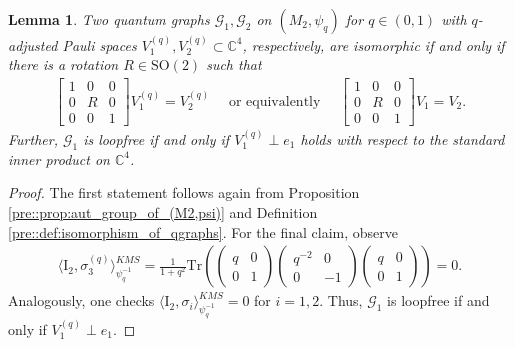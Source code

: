\documentclass{amsart}
\newtheorem{lemma}[thm]{Lemma}
\newcommand{\C}{\mathbb{C}}
\begin{document}
\begin{lemma}
    \label{pau::lemma:q_adjusted_Pauli_spaces_of_isomorphic_nontracial_qgraphs}
    Two quantum graphs $\mathcal{G}_1, \mathcal{G}_2$ on $(M_2, \psi_q)$ for $q \in (0,1)$ with $q$-adjusted Pauli spaces $V_1^{(q)}, V_2^{(q)} \subset \C^4$, respectively, are isomorphic if and only if there is a rotation $R \in \mathrm{SO}(2)$ such that
    \begin{align*}
        \left[\begin{array}{c|c|c}
            1& 0 & 0 \\
            \hline
            0 & R & 0 \\
            \hline 
            0 & 0 & 1
            \end{array}\right]
            V_1^{(q)} = V_2^{(q)}
            \quad\text{ or equivalently }\quad
            \left[\begin{array}{c|c|c}
            1& 0 & 0 \\
            \hline
            0 & R & 0 \\
            \hline 
            0 & 0 & 1
            \end{array}\right]
            V_1 = V_2.
    \end{align*}
    Further, $\mathcal{G}_1$ is loopfree if and only if $V_1^{(q)} \perp e_1$ holds with respect to the standard inner product on $\C^4$.
\end{lemma}

\begin{proof}
    The first statement follows again from Proposition \ref{pre::prop:aut_group_of_(M2,psi)} and Definition \ref{pre::def:isomorphism_of_qgraphs}. 
    For the final claim, observe
    \begin{align*}
    \langle \mathrm{I}_2, \sigma_3^{(q)} \rangle_{\psi_q^{-1}}^{KMS}
        = \frac{1}{1+q^2} \mathrm{Tr}\left( \begin{pmatrix}
            q & 0 \\
            0 & 1
        \end{pmatrix}
        \begin{pmatrix}
            q^{-2} & 0 \\
            0 & -1
        \end{pmatrix}
        \begin{pmatrix}
            q & 0 \\
            0 & 1
        \end{pmatrix} \right) 
        = 0.
    \end{align*}
    Analogously, one checks $\langle \mathrm{I}_2, \sigma_i \rangle_{\psi_q^{-1}}^{KMS} = 0$ for $i =1, 2$.
    Thus, $\mathcal{G}_1$ is loopfree if and only if $V_1^{(q)} \perp e_1$.
\end{proof}
\end{document}
